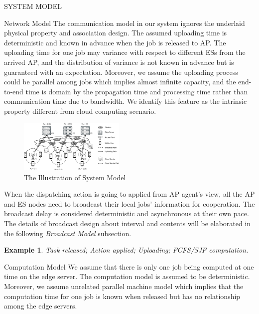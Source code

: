 \documentclass[10pt, conference, letterpaper]{IEEEtran}
\newtheorem{example}{Example}
\begin{document}
\begin{section}{SYSTEM MODEL}
\begin{subsection}{Network Model}
            The communication model in our system ignores the underlaid physical property and association design.
            The assumed uploading time is deterministic and known in advance when the job is released to AP. The uploading time for one job may variance with respect to different ESs from the arrived AP, and the distribution of variance is not known in advance but is guaranteed with an expectation.
            Moreover, we assume the uploading process could be parallel among jobs which implies almost infinite capacity, and the end-to-end time is domain by the propagation time and processing time rather than communication time due to bandwidth. We identify this feature as the intrinsic property different from cloud computing scenario.
            \begin{figure}[ht]
                \centering
                \includegraphics[width=0.45\textwidth, trim={0.5cm 0.5cm 0.5cm 0.5cm}, clip]{system-model.pdf}
                \caption{The Illustration of System Model}
                \label{fig:system}
            \end{figure}
                
            When the dispatching action is going to applied from AP agent's view, all the AP and ES nodes need to broadcast their local jobs' information for cooperation. The broadcast delay is considered deterministic and asynchronous at their own pace.
            The details of broadcast design about interval and contents will be elaborated in the following \textit{Broadcast Model} subsection.

            \begin{example}
                Task released; Action applied; Uploading; FCFS/SJF computation.
            \end{example}
        \end{subsection}

        \begin{subsection}{Computation Model}
            We assume that there is only one job being computed at one time on the edge server. The computation model is assumed to be deterministic.
            Moreover, we assume unrelated parallel machine model which implies that the computation time for one job is known when released but has no relationship among the edge servers.
        \end{subsection}


\end{section}
\end{document}
